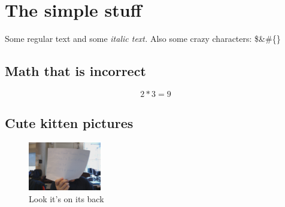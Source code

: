 \documentclass{article}%
\begin{document}
%
\normalsize%
\section{The simple stuff}%
\label{sec:The simple stuff}%
Some regular text and some%
\textit{italic text. }%
\newline%
Also some crazy characters: \$\&\#\{\}%
\subsection{Math that is incorrect}%
\label{subsec:Math that is incorrect}%
\[%
2*3 = 9%
\]

%
\subsection{Cute kitten pictures}%
\label{subsec:Cute kitten pictures}%


\begin{figure}[h!]%
\centering%
\includegraphics[width=120px]{image 1.jpg}%
\caption{Look it's on its back}%
\end{figure}

%
\end{document}

